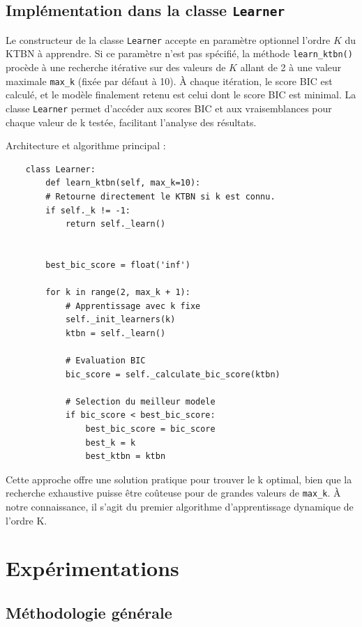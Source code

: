 \documentclass{article}
\begin{document}
\subsection{Implémentation dans la classe \texttt{Learner}}

Le constructeur de la classe \texttt{Learner} accepte en paramètre optionnel l'ordre $K$ du KTBN à apprendre.
Si ce paramètre n'est pas spécifié, la méthode \texttt{learn\_ktbn()} procède à une recherche itérative sur des
valeurs de $K$ allant de 2 à une valeur maximale \texttt{max\_k} (fixée par défaut à 10). À chaque itération,
le score BIC est calculé, et le modèle finalement retenu est celui dont le score BIC est minimal.  La classe
\texttt{Learner} permet d'accéder aux scores BIC et aux vraisemblances pour chaque valeur de k testée,
facilitant l'analyse des résultats.

Architecture et algorithme principal :

\begin{lstlisting}
    class Learner:
        def learn_ktbn(self, max_k=10):
        # Retourne directement le KTBN si k est connu.
        if self._k != -1:
            return self._learn()
        
        
        best_bic_score = float('inf')
        
        for k in range(2, max_k + 1):
            # Apprentissage avec k fixe
            self._init_learners(k)
            ktbn = self._learn()
            
            # Evaluation BIC
            bic_score = self._calculate_bic_score(ktbn)
            
            # Selection du meilleur modele
            if bic_score < best_bic_score:
                best_bic_score = bic_score
                best_k = k
                best_ktbn = ktbn
\end{lstlisting}


Cette approche offre une solution pratique pour trouver le k optimal, bien que la recherche exhaustive puisse
être coûteuse pour de grandes valeurs de \texttt{max\_k}. À notre connaissance, il s'agit du premier algorithme
d'apprentissage dynamique de l'ordre K.

\section{Expérimentations}

\subsection{Méthodologie générale}
\end{document}
